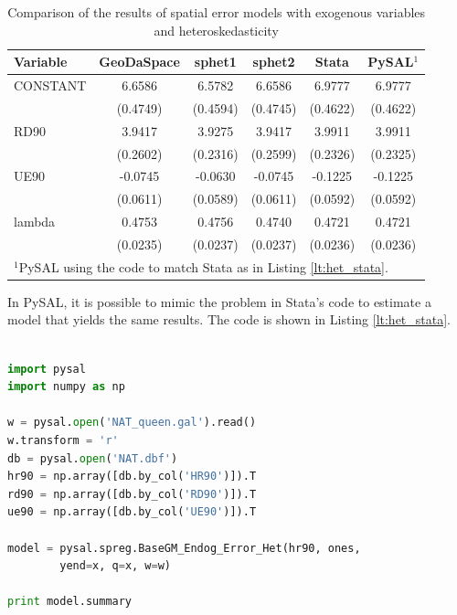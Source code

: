 \documentclass{article}
\begin{document}
\begin{table}[htpb]
\caption{Comparison of the results of spatial error models with exogenous variables and heteroskedasticity}
\label{t:res_het}
\centering
\begin{small}
\begin{tabular}{l|ccccc} \hline
\textbf{Variable}&\textbf{GeoDaSpace}&\textbf{sphet1}&\textbf{sphet2}&\textbf{Stata}&\textbf{PySAL$^1$}\\ \hline
CONSTANT&6.6586&6.5782&6.6586&6.9777&6.9777\\
&(0.4749)&(0.4594)&(0.4745)&(0.4622)&(0.4622)\\
RD90&3.9417&3.9275&3.9417&3.9911&3.9911\\
&(0.2602)&(0.2316)&(0.2599)&(0.2326)&(0.2325)\\
UE90&-0.0745&-0.0630&-0.0745&-0.1225&-0.1225\\
&(0.0611)&(0.0589)&(0.0611)&(0.0592)&(0.0592)\\
lambda&0.4753&0.4756&0.4740&0.4721&0.4721\\
&(0.0235)&(0.0237)&(0.0237)&(0.0236)&(0.0236)\\
\hline
\multicolumn{6}{l}{\scriptsize{$^1$PySAL using the code to match Stata as in Listing \ref{lt:het_stata}.}} \\
\end{tabular}
\end{small}
\end{table}

In PySAL, it is possible to mimic the problem in Stata's code to estimate a model that yields the same results. The code is shown in Listing \ref{lt:het_stata}.

\begin{code}
\begin{lstlisting}[label=lt:het_stata,caption=Using PySAL to match the results of spatial error models with heteroskedasticity from Stata,language=Python]

import pysal
import numpy as np

w = pysal.open('NAT_queen.gal').read()
w.transform = 'r'
db = pysal.open('NAT.dbf')
hr90 = np.array([db.by_col('HR90')]).T
rd90 = np.array([db.by_col('RD90')]).T
ue90 = np.array([db.by_col('UE90')]).T

model = pysal.spreg.BaseGM_Endog_Error_Het(hr90, ones,
        yend=x, q=x, w=w)

print model.summary

\end{lstlisting}
\end{code}
\end{document}
